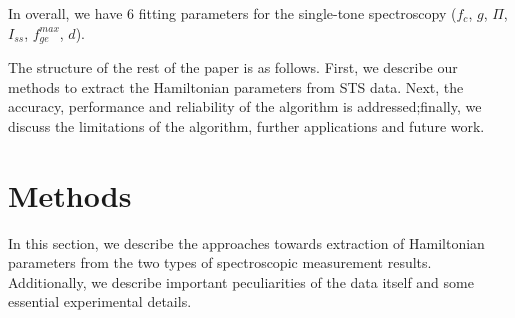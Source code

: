 \documentclass[%
 aip,
 draft,
 amsmath,amssymb,
 reprint,%
]{revtex4-1}
\begin{document}
In overall, we have 6 fitting parameters for the single-tone spectroscopy ($f_c$, $g$, $\Pi$, $I_{ss}$, $f_{ge}^{max}$, $d$).

The structure of the rest of the paper is as follows. First, we describe our methods to extract the Hamiltonian parameters from STS data. Next, the accuracy, performance and reliability of the algorithm is addressed;finally, we discuss the limitations of the algorithm, further applications and future work. 



\section{Methods}

In this section, we describe the approaches towards extraction of Hamiltonian parameters from the two types of spectroscopic measurement results. Additionally, we describe important peculiarities of the data itself and some essential experimental details.
\end{document}
